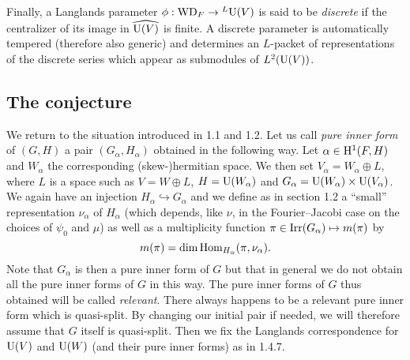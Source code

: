 Finally, a Langlands parameter $\phi: \mathrm{WD}_F \to {}^L \mathrm{U}(V)$ is said to be \emph{discrete} if the centralizer of its image in $\widehat{\mathrm{U}(V)}$ is finite.
A discrete parameter is automatically tempered (therefore also generic) and determines an $L$-packet of representations of the discrete series which appear as submodules of $L^2(\mathrm{U}(V))$.



\subsection{The conjecture}



We return to the situation introduced in 1.1 and 1.2.
Let us call \emph{pure inner form} of $(G, H)$ a pair $(G_\alpha,H_\alpha)$ obtained in the following way.
Let $\alpha \in \mathrm{H}^1(F, H)$ and $W_\alpha$ the corresponding (skew-)hermitian space.
We then set $V_\alpha = W_\alpha \oplus L$, where $L$ is a space such as $V = W \oplus L$, $H = \mathrm{U}(W_\alpha)$ and $G_\alpha = \mathrm{U}(W_\alpha) \times \mathrm{U}(V_\alpha)$.
We again have an injection $H_\alpha \hookrightarrow G_\alpha$ and we define as in section 1.2 a “small” representation $\nu_\alpha$ of $H_\alpha$ (which depends, like $\nu$, in the Fourier--Jacobi case on the choices of $\psi_0$ and $\mu$) as well as a multiplicity function $\pi\in \mathrm{Irr}(G_\alpha) \mapsto m(\pi)$ by
\[
    m(\pi) = \dim \mathrm{Hom}_{H_\alpha} (\pi, \nu_\alpha).
\]
Note that $G_\alpha$ is then a pure inner form of $G$ but that in general we do not obtain all the pure inner forms of $G$ in this way.
The pure inner forms of $G$ thus obtained will be called \emph{relevant}.
There always happens to be a relevant pure inner form which is quasi-split.
By changing our initial pair if needed, we will therefore assume that $G$ itself is quasi-split.
Then we fix the Langlands correspondence for $\mathrm{U}(V)$ and $\mathrm{U}(W)$ (and their pure inner forms) as in 1.4.7.

